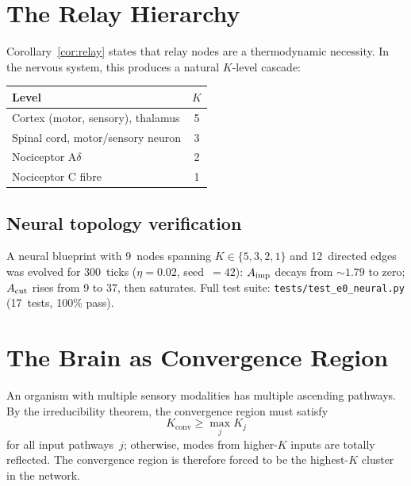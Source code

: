 \documentclass[aps,pre,twocolumn,superscriptaddress,floatfix]{revtex4-2}
\begin{document}
\section{The Relay Hierarchy}
\label{sec:relay}

Corollary~\ref{cor:relay} states that relay nodes are a
thermodynamic necessity.
In the nervous system, this produces a natural
$K$-level cascade:

\begin{center}
\begin{tabular}{lc}
\hline
\textbf{Level} & $K$ \\
\hline
Cortex (motor, sensory), thalamus & 5 \\
Spinal cord, motor/sensory neuron & 3 \\
Nociceptor A$\delta$ & 2 \\
Nociceptor C fibre & 1 \\
\hline
\end{tabular}
\end{center}

\subsection{Neural topology verification}
\label{sec:neural-topo}

A neural blueprint with 9~nodes spanning
$K \in \{5, 3, 2, 1\}$ and 12~directed edges
was evolved for 300~ticks ($\eta = 0.02$, seed~$= 42$):
$A_{\text{imp}}$ decays from $\sim\!1.79$ to zero;
$A_{\text{cut}}$ rises from 9 to 37, then saturates.
Full test suite: \texttt{tests/test\_e0\_neural.py}
(17~tests, 100\% pass).


\section{The Brain as Convergence Region}
\label{sec:brain}

An organism with multiple sensory modalities has
multiple ascending pathways.
By the irreducibility theorem, the convergence region
must satisfy
\begin{equation}
  K_{\text{conv}} \ge \max_j K_j
  \label{eq:K-convergence}
\end{equation}
for all input pathways~$j$; otherwise, modes from
higher-$K$ inputs are totally reflected.
The convergence region is therefore forced to be the
highest-$K$ cluster in the network.
\end{document}
